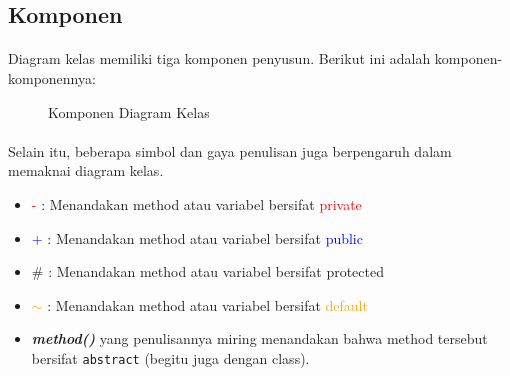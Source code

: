 \documentclass{../praktikum-ppt}
\begin{document}
    \subsection{Komponen}
    \begin{frame}{\insertsection}
      \framesubtitle{\insertsubsection}
      Diagram kelas memiliki tiga komponen penyusun. Berikut ini adalah komponen-komponennya:
      \begin{figure}[h!]
        \centering
        \caption{Komponen Diagram Kelas}
      \end{figure}
    \end{frame}

    \begin{frame}{\insertsection}
      \framesubtitle{\insertsubsection}
      Selain itu, beberapa simbol dan gaya penulisan juga berpengaruh dalam memaknai diagram kelas.
      \begin{itemize}
        \item \textcolor{red}{-} : Menandakan method atau variabel bersifat \textcolor{red}{private}
        \item \textcolor{blue}{+} : Menandakan method atau variabel bersifat \textcolor{blue}{public}
        \item \textcolor{green!80!black}{\#} : Menandakan method atau variabel bersifat \textcolor{green!80!black}{protected}
        \item \textcolor{orange}{$\sim$} : Menandakan method atau variabel bersifat \textcolor{orange}{default}
        \item \textbf{\textit{method()}} yang penulisannya miring menandakan bahwa method tersebut bersifat \texttt{abstract} (begitu juga dengan class).
      \end{itemize}
    \end{frame}
\end{document}
